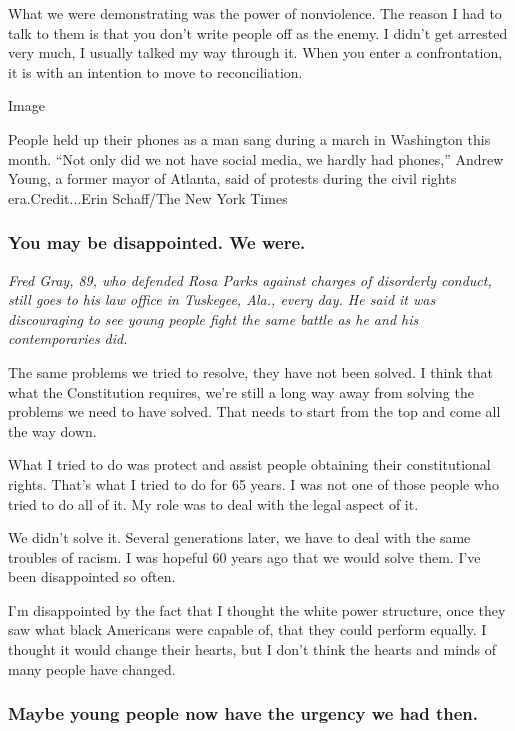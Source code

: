What we were demonstrating was the power of nonviolence. The reason I
had to talk to them is that you don't write people off as the enemy. I
didn't get arrested very much, I usually talked my way through it. When
you enter a confrontation, it is with an intention to move to
reconciliation.

Image

People held up their phones as a man sang during a march in Washington
this month. ``Not only did we not have social media, we hardly had
phones,'' Andrew Young, a former mayor of Atlanta, said of protests
during the civil rights era.Credit...Erin Schaff/The New York Times

\hypertarget{you-may-be-disappointed-we-were}{%
\subsubsection{You may be disappointed. We
were.}\label{you-may-be-disappointed-we-were}}

\emph{Fred Gray, 89, who defended Rosa Parks against charges of
disorderly conduct, still goes to his law office in Tuskegee, Ala.,
every day. He said it was discouraging to see young people fight the
same battle as he and his contemporaries did.}

The same problems we tried to resolve, they have not been solved. I
think that what the Constitution requires, we're still a long way away
from solving the problems we need to have solved. That needs to start
from the top and come all the way down.

What I tried to do was protect and assist people obtaining their
constitutional rights. That's what I tried to do for 65 years. I was not
one of those people who tried to do all of it. My role was to deal with
the legal aspect of it.

We didn't solve it. Several generations later, we have to deal with the
same troubles of racism. I was hopeful 60 years ago that we would solve
them. I've been disappointed so often.

I'm disappointed by the fact that I thought the white power structure,
once they saw what black Americans were capable of, that they could
perform equally. I thought it would change their hearts, but I don't
think the hearts and minds of many people have changed.

\hypertarget{maybe-young-people-now-have-the-urgency-we-had-then}{%
\subsubsection{\texorpdfstring{\textbf{Maybe young people now have the
urgency we had
then.}}{Maybe young people now have the urgency we had then.}}\label{maybe-young-people-now-have-the-urgency-we-had-then}}


